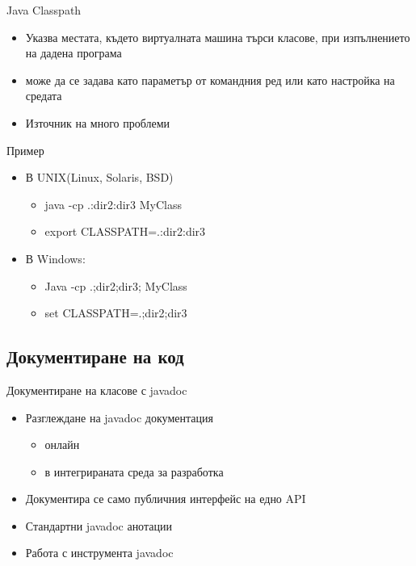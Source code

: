 \documentclass{beamer}
\begin{document}
\begin{frame}{Java Classpath}
  \transdissolve
  \begin{itemize}
  \item Указва местата, където виртуалната машина търси класове, при
    изпълнението на дадена програма \pause
  \item може да се задава като параметър от командния ред или като
    настройка на средата \pause
  \item Източник на много проблеми
  \end{itemize}
\end{frame}

\begin{frame}{Пример}
  \transdissolve
  \begin{itemize}
  \item В UNIX(Linux, Solaris, BSD)
      \begin{itemize}
      \item java -cp .:dir2:dir3 MyClass
      \item export CLASSPATH=.:dir2:dir3
      \end{itemize} \pause
    \item В Windows:
      \begin{itemize}
      \item Java -cp .;dir2;dir3; MyClass
      \item set CLASSPATH=.;dir2;dir3
      \end{itemize}
  \end{itemize}
\end{frame}

\subsection{Документиране на код}
\begin{frame}{Документиране на класове с javadoc}
  \transdissolve
  \begin{itemize}
  \item Разглеждане на javadoc документация \pause
    \begin{itemize}
      \item онлайн
      \item в интегрираната среда за разработка
    \end{itemize}
  \item Документира се само публичния интерфейс на едно API \pause
  \item Стандартни javadoc анотации \pause
  \item Работа с инструмента javadoc
  \end{itemize}
\end{frame}
\end{document}
